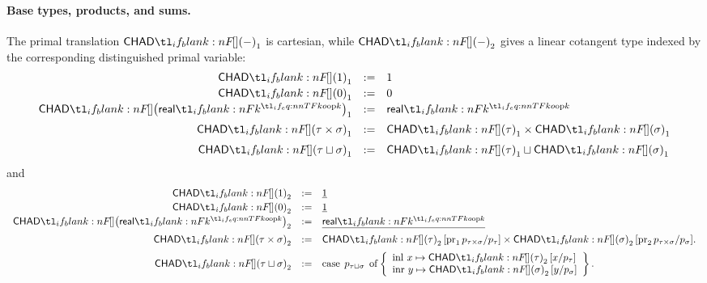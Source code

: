 \documentclass[11pt,a4paper]{article}
\theoremstyle{definition}
\theoremstyle{remark}
\providecommand{\casubst}[3]{#1[#3/#2]}
\providecommand{\lintype}[1]{\underline{#1}}
\begin{document}
\paragraph{Base types, products, and sums.}
The primal translation \(\Fun[np]{\chad}{-}_{1}\) is cartesian, while
\(\Fun[np]{\chad}{-}_{2}\) gives a linear cotangent type indexed by the
corresponding distinguished primal variable:
\begin{equation}
  \label{eq:appendix-chad-type-translation-core-basis}
  \begin{array}{rcl}
    \Fun[np]{\chad}{1}_{1} &:=& 1
    \\[2pt]
    \Fun[np]{\chad}{0}_{1} &:=& 0
    \\[2pt]
    \Fun[np]{\chad}{\srcreal[k]}_{1} &:=& \srcreal[k]
    \\[6pt]
    \Fun[np]{\chad}{\tau \times \sigma}_{1}
    &:=&
    \Fun[np]{\chad}{\tau}_{1} \times \Fun[np]{\chad}{\sigma}_{1}
    \\[6pt]
    \Fun[np]{\chad}{\tau \sqcup \sigma}_{1}
    &:=&
    \Fun[np]{\chad}{\tau}_{1} \sqcup \Fun[np]{\chad}{\sigma}_{1}
  \end{array}
\end{equation}
and
\begin{equation}
  \label{eq:appendix-chad-type-translation-core-cotangents}
  \begin{array}{rcl}
    \Fun[np]{\chad}{1}_{2} &:=& \lintype{1}
    \\[2pt]
    \Fun[np]{\chad}{0}_{2} &:=& \lintype{1}
    \\[2pt]
    \Fun[np]{\chad}{\srcreal[k]}_{2} &:=& \lintype{\srcreal[k]}
    \\[6pt]
    \Fun[np]{\chad}{\tau \times \sigma}_{2}
    &:=&
    \casubst{\Fun[np]{\chad}{\tau}_{2}}{p_{\tau}}{\opn[b]{pr}_{1}p_{\tau\times\sigma}}
    \times
    \casubst{\Fun[np]{\chad}{\sigma}_{2}}{p_{\sigma}}{\opn[b]{pr}_{2}p_{\tau\times\sigma}}.
    \\[6pt]
    \Fun[np]{\chad}{\tau \sqcup \sigma}_{2}
    &:=&
    \opn[b]{case}\;p_{\tau\sqcup\sigma}\;\opn[b]{of}
    \left\{
    \begin{array}{l}
      \opn[b]{inl}\,x \mapsto
      \casubst{\Fun[np]{\chad}{\tau}_{2}}{p_{\tau}}{x}
      \\
      \opn[b]{inr}\,y \mapsto
      \casubst{\Fun[np]{\chad}{\sigma}_{2}}{p_{\sigma}}{y}
    \end{array}
    \right\}.
  \end{array}
\end{equation}
\end{document}
